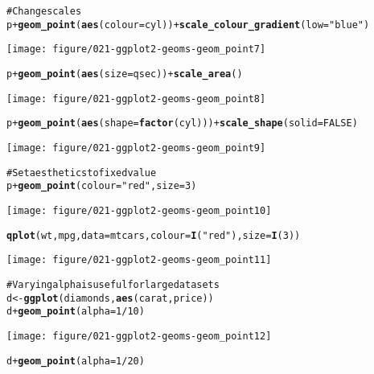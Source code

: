\documentclass[a4paper,titlepage]{tufte-handout}\usepackage{graphicx, color}
\makeatletter
\def\maxwidth{ %
  \ifdim\Gin@nat@width>\linewidth
    \linewidth
  \else
    \Gin@nat@width
  \fi
}
\newcommand{\hlfunctioncall}[1]{\textcolor[rgb]{0.501960784313725,0,0.329411764705882}{\textbf{#1}}}%
\newcommand{\hlstring}[1]{\textcolor[rgb]{0.6,0.6,1}{#1}}%
\newcommand{\hlcomment}[1]{\textcolor[rgb]{0.180392156862745,0.6,0.341176470588235}{#1}}%
\newenvironment{kframe}{%
 \def\at@end@of@kframe{}%
 \ifinner\ifhmode%
  \def\at@end@of@kframe{\end{minipage}}%
  \begin{minipage}{\columnwidth}%
 \fi\fi%
 \def\FrameCommand##1{\hskip\@totalleftmargin \hskip-\fboxsep
 \colorbox{shadecolor}{##1}\hskip-\fboxsep
     \hskip-\linewidth \hskip-\@totalleftmargin \hskip\columnwidth}%
 \MakeFramed {\advance\hsize-\width
   \@totalleftmargin\z@ \linewidth\hsize
   \@setminipage}}%
 {\par\unskip\endMakeFramed%
 \at@end@of@kframe}
\newenvironment{knitrout}{}{} %
\makeatother
\begin{document}
\begin{knitrout}
\begin{kframe}
\begin{alltt}
\hlcomment{# Change scales}
p + \hlfunctioncall{geom_point}(\hlfunctioncall{aes}(colour = cyl)) + \hlfunctioncall{scale_colour_gradient}(low = \hlstring{"blue"})
\end{alltt}
\end{kframe}\texttt{[image: figure/021-ggplot2-geoms-geom\_point7]} \begin{kframe}\begin{alltt}
p + \hlfunctioncall{geom_point}(\hlfunctioncall{aes}(size = qsec)) + \hlfunctioncall{scale_area}()
\end{alltt}
\end{kframe}\texttt{[image: figure/021-ggplot2-geoms-geom\_point8]} \begin{kframe}\begin{alltt}
p + \hlfunctioncall{geom_point}(\hlfunctioncall{aes}(shape = \hlfunctioncall{factor}(cyl))) + \hlfunctioncall{scale_shape}(solid = FALSE)
\end{alltt}
\end{kframe}\texttt{[image: figure/021-ggplot2-geoms-geom\_point9]} \begin{kframe}\begin{alltt}
\hlcomment{# Set aesthetics to fixed value}
p + \hlfunctioncall{geom_point}(colour = \hlstring{"red"}, size = 3)
\end{alltt}
\end{kframe}\texttt{[image: figure/021-ggplot2-geoms-geom\_point10]} \begin{kframe}\begin{alltt}
\hlfunctioncall{qplot}(wt, mpg, data = mtcars, colour = \hlfunctioncall{I}(\hlstring{"red"}), size = \hlfunctioncall{I}(3))
\end{alltt}
\end{kframe}\texttt{[image: figure/021-ggplot2-geoms-geom\_point11]} \begin{kframe}\begin{alltt}
\hlcomment{# Varying alpha is useful for large datasets}
d <- \hlfunctioncall{ggplot}(diamonds, \hlfunctioncall{aes}(carat, price))
d + \hlfunctioncall{geom_point}(alpha = 1/10)
\end{alltt}
\end{kframe}\texttt{[image: figure/021-ggplot2-geoms-geom\_point12]} \begin{kframe}\begin{alltt}
d + \hlfunctioncall{geom_point}(alpha = 1/20)
\end{alltt}

\end{kframe}
\end{knitrout}
\end{document}
